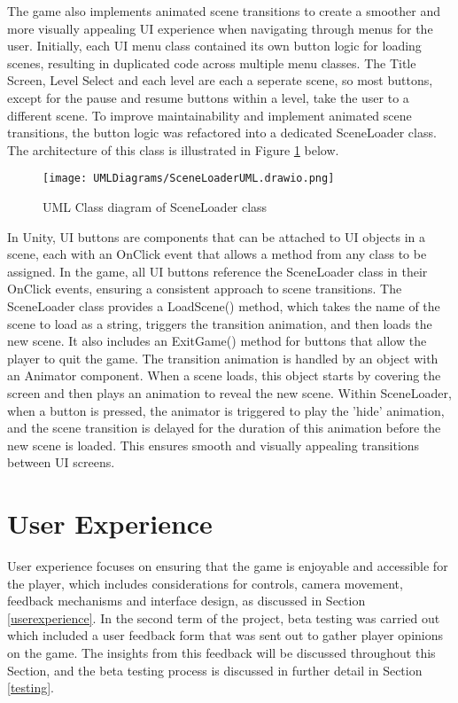 \documentclass[10pt]{final_report}
\begin{document}
The game also implements animated scene transitions to create a smoother and more visually appealing UI experience when navigating through menus for the user. Initially, each UI menu class contained its own button logic for loading scenes, resulting in duplicated code across multiple menu classes. The Title Screen, Level Select and each level are each a seperate scene, so most buttons, except for the pause and resume buttons within a level, take the user to a different scene. To improve maintainability and implement animated scene transitions, the button logic was refactored into a dedicated SceneLoader class. The architecture of this class is illustrated in Figure \ref{fig:label_SceneLoader} below.

\begin{figure}[H]
    \centering
    \texttt{[image: UMLDiagrams/SceneLoaderUML.drawio.png]}
    \caption{UML Class diagram of SceneLoader class}
    \label{fig:label_SceneLoader}
\end{figure}

In Unity, UI buttons are components that can be attached to UI objects in a scene, each with an OnClick event that allows a method from any class to be assigned. In the game, all UI buttons reference the SceneLoader class in their OnClick events, ensuring a consistent approach to scene transitions. The SceneLoader class provides a LoadScene() method, which takes the name of the scene to load as a string, triggers the transition animation, and then loads the new scene. It also includes an ExitGame() method for buttons that allow the player to quit the game. The transition animation is handled by an object with an Animator component. When a scene loads, this object starts by covering the screen and then plays an animation to reveal the new scene. Within SceneLoader, when a button is pressed, the animator is triggered to play the 'hide' animation, and the scene transition is delayed for the duration of this animation before the new scene is loaded. This ensures smooth and visually appealing transitions between UI screens.

\section{User Experience}\label{UX}
User experience focuses on ensuring that the game is enjoyable and accessible for the player, which includes considerations for controls, camera movement, feedback mechanisms and interface design, as discussed in Section \ref{userexperience}. In the second term of the project, beta testing was carried out which included a user feedback form that was sent out to gather player opinions on the game. The insights from this feedback will be discussed throughout this Section, and the beta testing process is discussed in further detail in Section \ref{testing}.
\end{document}
